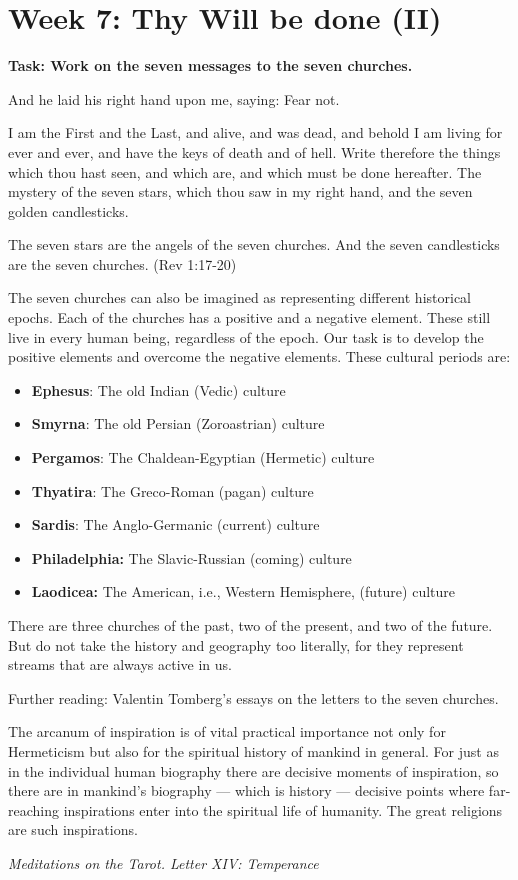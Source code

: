 \section{Week 7: Thy Will be done (II)}

\textbf{Task: Work on the seven messages to the seven churches.}

And he laid his right hand upon me, saying: Fear not.

I am the First and the Last, and alive, and was dead, and behold I am living for ever and ever, and have the keys of
death and of hell. Write therefore the things which thou hast seen, and which are, and which must be done hereafter.
The mystery of the seven stars, which thou saw in my right hand, and the seven golden candlesticks.

The seven stars are the angels of the seven churches. And the seven candlesticks are the seven churches. (Rev 1:17-20)

The seven churches can also be imagined as representing different historical epochs. Each of the churches has a positive
and a negative element. These still live in every human being, regardless of the epoch. Our task is to develop the
positive elements and overcome the negative elements. These cultural periods are:

\begin{itemize}
\item \textbf{Ephesus}: The old Indian (Vedic) culture 
\item \textbf{Smyrna}: The old Persian (Zoroastrian) culture 
\item \textbf{Pergamos}: The Chaldean-Egyptian (Hermetic) culture 
\item \textbf{Thyatira}: The Greco-Roman (pagan) culture 
\item \textbf{Sardis}: The Anglo-Germanic (current) culture 
\item \textbf{Philadelphia:} The Slavic-Russian (coming) culture 
\item \textbf{Laodicea:} The American, i.e., Western Hemisphere, (future) culture 
\end{itemize}
There are three churches of the past, two of the present, and two of the future. But do not take the history and
geography too literally, for they represent streams that are always active in us.

Further reading: Valentin Tomberg's essays on the letters to the seven churches.

\begin{quotationx}
The arcanum of inspiration is of vital practical importance not only for Hermeticism but also for the spiritual history
of mankind in general. For just as in the individual human biography there are decisive moments of inspiration, so
there are in mankind's biography — which is history —
decisive points where far-reaching inspirations enter into the spiritual life of humanity. The great religions are such
inspirations. \begin{flushright} \emph{Meditations on the Tarot. Letter XIV: Temperance}\end{flushright}

\end{quotationx}

